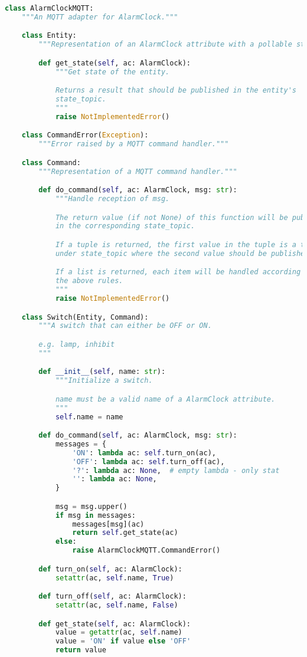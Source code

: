 \begin{lstlisting}[language=Python]
class AlarmClockMQTT:
    """An MQTT adapter for AlarmClock."""

    class Entity:
        """Representation of an AlarmClock attribute with a pollable state."""

        def get_state(self, ac: AlarmClock):
            """Get state of the entity.

            Returns a result that should be published in the entity's
            state_topic.
            """
            raise NotImplementedError()

    class CommandError(Exception):
        """Error raised by a MQTT command handler."""

    class Command:
        """Representation of a MQTT command handler."""

        def do_command(self, ac: AlarmClock, msg: str):
            """Handle reception of msg.

            The return value (if not None) of this function will be published
            in the corresponding state_topic.

            If a tuple is returned, the first value in the tuple is a topic
            under state_topic where the second value should be published.

            If a list is returned, each item will be handled according to
            the above rules.
            """
            raise NotImplementedError()

    class Switch(Entity, Command):
        """A switch that can either be OFF or ON.

        e.g. lamp, inhibit
        """

        def __init__(self, name: str):
            """Initialize a switch.

            name must be a valid name of a AlarmClock attribute.
            """
            self.name = name

        def do_command(self, ac: AlarmClock, msg: str):
            messages = {
                'ON': lambda ac: self.turn_on(ac),
                'OFF': lambda ac: self.turn_off(ac),
                '?': lambda ac: None,  # empty lambda - only stat
                '': lambda ac: None,
            }

            msg = msg.upper()
            if msg in messages:
                messages[msg](ac)
                return self.get_state(ac)
            else:
                raise AlarmClockMQTT.CommandError()

        def turn_on(self, ac: AlarmClock):
            setattr(ac, self.name, True)

        def turn_off(self, ac: AlarmClock):
            setattr(ac, self.name, False)

        def get_state(self, ac: AlarmClock):
            value = getattr(ac, self.name)
            value = 'ON' if value else 'OFF'
            return value
\end{lstlisting}

